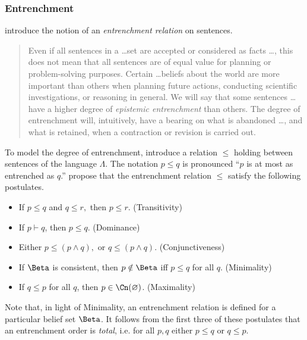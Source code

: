 \subsubsection{Entrenchment}
\label{entrenchment}
\citet{gardenfors1988revisions} introduce the notion of an {\em entrenchment
relation} on sentences.
\begin{quote}
  Even if all sentences in a \ldots  set are accepted or considered as facts
  \ldots, this does not mean that all sentences are of equal value for planning
  or problem-solving purposes. Certain \ldots beliefs about the world are more
  important than others when planning future actions, conducting scientific
  investigations, or reasoning in general. We will say that some sentences
  \ldots have a higher degree of {\em epistemic entrenchment} than others. The
  degree of entrenchment will, intuitively, have a bearing on what is abandoned
  \ldots, and what is retained, when a contraction or revision is carried out. 
\end{quote} 
To model the degree of entrenchment, \citet{gardenfors1988revisions} introduce a
relation $\leq$ holding between sentences of the language $\Lambda.$ The
notation $p\leq q$ is pronounced ``$p$ is at most as entrenched as $q$.''
\citet{gardenfors1988revisions} propose that the entrenchment relation $\leq$
satisfy the following postulates.
\begin{itemize}
\item[] If $p\leq q$ and $q\leq r,$ then $p\leq r$. \hfill (Transitivity)
\item[] If $p\vdash q$, then $p\leq q$. \hfill(Dominance)
\item[] Either $p\leq (p\wedge q),$ or $q\leq (p \wedge q)$.
\hfill(Conjunctiveness)
\item[] If $\Beta$ is consistent, then $p\notin \Beta$ iff $p\leq q$ for all
$q$. \hfill(Minimality) 
\item[] If $q\leq p$ for all $q$, then $p\in \Cn(\varnothing)$.
\hfill(Maximality)
\end{itemize}
Note that, in light of Minimality, an entrenchment relation is defined for a
particular belief set $\Beta$. It follows from the first three of these
postulates that an entrenchment order is {\em total}, i.e. for all $p,q$ either
$p\leq q$ or $q\leq p$.

